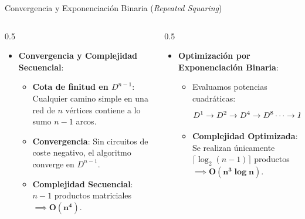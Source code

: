 \documentclass[
  ignorenonframetext,
]{beamer}
\providecommand{\tightlist}{%
  \setlength{\itemsep}{0pt}\setlength{\parskip}{0pt}}
\begin{document}
\begin{frame}{Convergencia y Exponenciación Binaria (\emph{Repeated
Squaring})}
\label{convergencia-y-exponenciaciuxf3n-binaria-repeated-squaring}
\begin{columns}[T]
\begin{column}{0.5\linewidth}
\begin{itemize}
\tightlist
\item
  \textbf{Convergencia y Complejidad Secuencial}:

  \begin{itemize}
  \tightlist
  \item
    \textbf{Cota de finitud en \(D^{n-1}\)}: Cualquier camino simple en
    una red de \(n\) vértices contiene a lo sumo \(n-1\) arcos.
  \item
    \textbf{Convergencia}: Sin circuitos de coste negativo, el algoritmo
    converge en \(D^{n-1}\).
  \item
    \textbf{Complejidad Secuencial}: \(n-1\) productos matriciales
    \(\implies \mathbf{O(n^4)}\).
  \end{itemize}
\end{itemize}
\end{column}

\begin{column}{0.5\linewidth}
\begin{itemize}
\tightlist
\item
  \textbf{Optimización por Exponenciación Binaria}:

  \begin{itemize}
  \tightlist
  \item
    Evaluamos potencias cuadráticas:
    \[ \small D^1 \to D^2 \to D^4 \to D^8 \dots \to D^{2^{\lceil \log_2(n-1) \rceil}} \]
  \item
    \textbf{Complejidad Optimizada}: Se realizan únicamente
    \(\lceil \log_2(n-1) \rceil\) productos
    \(\implies \mathbf{O(n^3 \log n)}\).
  \end{itemize}
\end{itemize}
\end{column}
\end{columns}
\end{frame}
\end{document}
